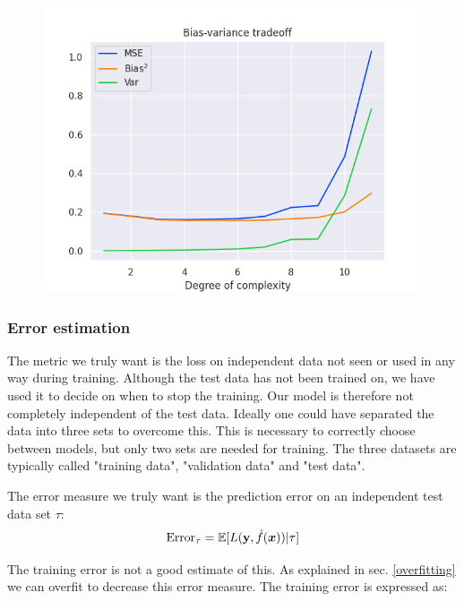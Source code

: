 \begin{figure}[h!]
\centering
\includegraphics[width=1\linewidth]{project_1/figures/bias_var_bootstrap.png}\label{plot_overfit}
\caption{}
\label{train_test_overfit}
\end{figure}



\subsubsection{Error estimation}

The metric we truly want is the loss on independent data not seen or used in any way during training. Although the test data has not been trained on, we have used it to decide on when to stop the training. Our model is therefore not completely independent of the test data. Ideally one could have separated the data into three sets to overcome this. This is necessary to correctly choose between models, but only two sets are needed for training. The three datasets are typically called "training data", "validation data" and "test data". 


The error measure we truly want is the prediction error on an independent test data set $\tau$: 
\begin{equation}\label{error_test}
    \text{Error}_{\tau} = \mathbb{E}[L(\mathbf{y},\hat{f}(\boldsymbol{x})) | \tau]
\end{equation}

The training error is not a good estimate of this. As explained in sec. \ref{overfitting} we can overfit to decrease this error measure. The training error is expressed as: 


